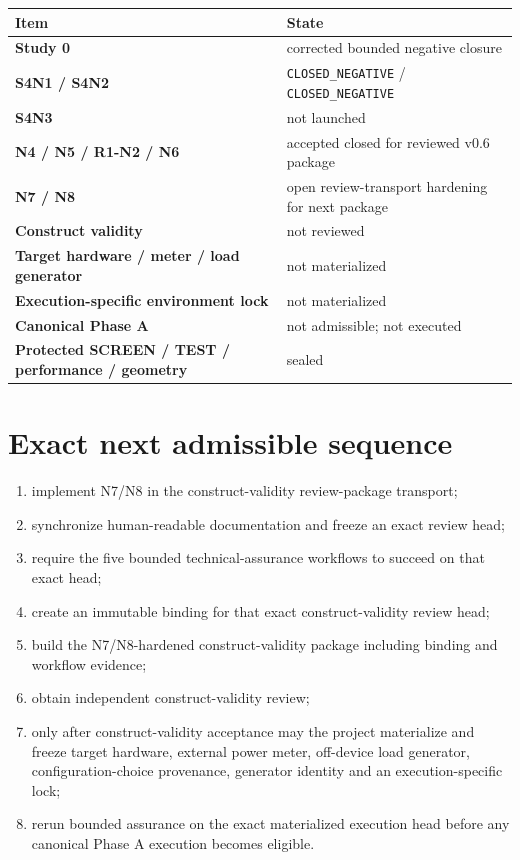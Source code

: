 \documentclass[10pt,a4paper]{article}
\newcommand{\code}[1]{\texttt{#1}}
\begin{document}
\begin{tabularx}{\linewidth}{>{\bfseries}l X}
\toprule
Item & State \\
\midrule
Study 0 & corrected bounded negative closure \\
S4N1 / S4N2 & \code{CLOSED\_NEGATIVE} / \code{CLOSED\_NEGATIVE} \\
S4N3 & not launched \\
N4 / N5 / R1-N2 / N6 & accepted closed for reviewed v0.6 package \\
N7 / N8 & open review-transport hardening for next package \\
Construct validity & not reviewed \\
Target hardware / meter / load generator & not materialized \\
Execution-specific environment lock & not materialized \\
Canonical Phase A & not admissible; not executed \\
Protected SCREEN / TEST / performance / geometry & sealed \\
\bottomrule
\end{tabularx}

\section{Exact next admissible sequence}

\begin{enumerate}
\item implement N7/N8 in the construct-validity review-package transport;
\item synchronize human-readable documentation and freeze an exact review head;
\item require the five bounded technical-assurance workflows to succeed on that exact head;
\item create an immutable binding for that exact construct-validity review head;
\item build the N7/N8-hardened construct-validity package including binding and workflow evidence;
\item obtain independent construct-validity review;
\item only after construct-validity acceptance may the project materialize and freeze target hardware, external power
meter, off-device load generator, configuration-choice provenance, generator identity and an execution-specific lock;
\item rerun bounded assurance on the exact materialized execution head before any canonical Phase A execution becomes eligible.
\end{enumerate}
\end{document}
